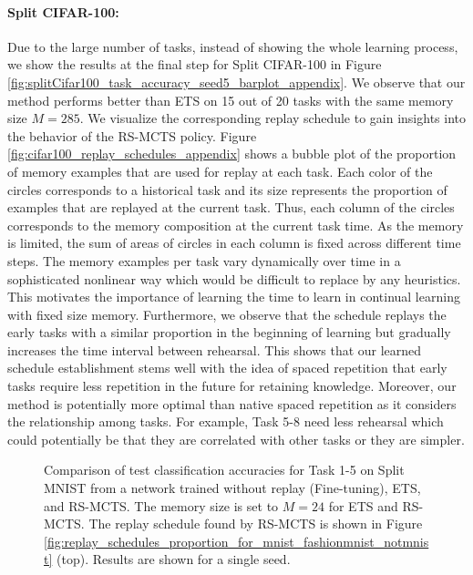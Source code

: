 \paragraph{Split CIFAR-100:}
Due to the large number of tasks, instead of showing the whole learning process, we show the results at the final step for Split CIFAR-100 in Figure \ref{fig:splitCifar100_task_accuracy_seed5_barplot_appendix}. We observe that our method performs better than ETS on 15 out of 20 tasks with the same memory size $M=285$. We visualize the corresponding replay schedule to gain insights into the behavior of the RS-MCTS policy.
Figure \ref{fig:cifar100_replay_schedules_appendix} shows a bubble plot of the proportion of memory examples that are used for replay at each task. Each color of the circles corresponds to a historical task and its size represents the proportion of examples that are replayed at the current task. Thus, each column of the circles corresponds to the memory composition at the current task time. As the memory is limited, the sum of areas of circles in each column is fixed across different time steps. 
The memory examples per task vary dynamically over time in a sophisticated nonlinear way which would be difficult to replace by any heuristics.
This motivates the importance of learning the time to learn in continual learning with fixed size memory.
Furthermore, we observe that the schedule replays the early tasks with a similar proportion in the beginning of learning but gradually increases the time interval between rehearsal.
This shows that our learned schedule establishment stems well with the idea of spaced repetition that early tasks require less repetition in the future for retaining knowledge. 
Moreover, our method is potentially more optimal than native spaced repetition as it considers the relationship among tasks. For example, Task 5-8 need less rehearsal which could potentially be that they are correlated with other tasks or they are simpler.  



\clearpage

\begin{figure*}[t]
\centering
\setlength{\figwidth}{0.31\textwidth}
\setlength{\figheight}{.17\textheight}

\caption{Comparison of test classification accuracies for Task 1-5 on Split MNIST from a network trained without replay (Fine-tuning), ETS, and RS-MCTS. The memory size is set to $M=24$ for ETS and RS-MCTS. The replay schedule found by RS-MCTS is shown in Figure \ref{fig:replay_schedules_proportion_for_mnist_fashionmnist_notmnist} (top). Results are shown for a single seed. }
\label{fig:splitMNIST_task_accuracies_M24_seed2}
\end{figure*}


